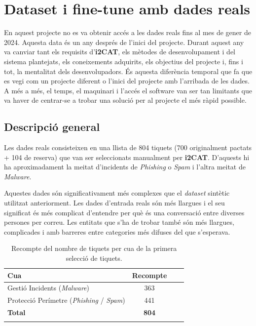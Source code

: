 \section{Dataset i fine-tune amb dades reals}
En aquest projecte no es va obtenir accés a les dades reals fins al mes de gener de 2024. Aquesta data és un any després de l'inici del projecte. Durant aquest any va canviar tant els requisits d'\textbf{i2CAT}, els mètodes de desenvolupament i del sistema plantejats, els coneixements adquirits, els objectius del projecte i, fins i tot, la mentalitat dels desenvolupadors. És aquesta diferència temporal que fa que es vegi com un projecte diferent o l'inici del projecte amb l'arribada de les dades. A més a més, el temps, el maquinari i l'accés el software van ser tan limitants que va haver de centrar-se a trobar una solució per al projecte el més ràpid possible.

\subsection{Descripció general}
Les dades reals consisteixen en una llista de 804 tiquets (700 originalment pactats + 104 de reserva) que van ser seleccionats manualment per \textbf{i2CAT}. D'aquests hi ha aproximadament la meitat d'incidents de \textit{Phishing} o \textit{Spam} i l'altra meitat de \textit{Malware}.

Aquestes dades són significativament més complexes que el \textit{dataset} sintètic utilitzat anteriorment. Les dades d'entrada reals són més llargues i el seu significat és més complicat d'entendre per què és una conversació entre diverses persones per correu. Les entitats que s'ha de trobar també són més llargues, complicades i amb barreres entre categories més difuses del que s'esperava.

\begin{table}[H]
    \centering
    \begin{tabular}{lccr}
        \Xhline{2\arrayrulewidth}
        \textbf{Cua} & \textbf{Recompte} \\
        \hline
        Gestió Incidents (\textit{Malware}) & 363 \\
        Protecció Perímetre (\textit{Phishing} / \textit{Spam}) & 441  \\
        \hline
        \textbf{Total} & \textbf{804} \\
        \Xhline{2\arrayrulewidth}
    \end{tabular}
    \caption{Recompte del nombre de tiquets per cua de la primera selecció de tiquets.}
    \label{tab:recompte_per_cua}
\end{table}

